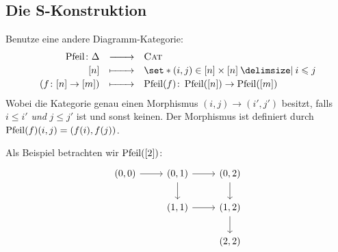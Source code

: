 \subsection{Die S-Konstruktion} %
\label{sub:die_s_konstruktion}
Benutze eine andere Diagramm-Kategorie:
\[
	\begin{array}{rcl}
		\textstyle \mathrm{Pfeil} \colon \Delta &\xrightarrow{\minwidthbox{}{2em}} & \textstyle \textsc{Cat} \\[0.5ex]
		\textstyle \benbrace*{n} &\xmapsto{\minwidthbox{\mbox{ }}{2em}} & \textstyle \set*{(i,j) \in \benbrace*{n} \times \benbrace*{n} \given  i \le j} \\[0.5ex]
		\textstyle (f \colon \benbrace*{n} \to \benbrace*{m}) &\xmapsto{\minwidthbox{\mbox{ }}{2em}} & \textstyle \operatorname{Pfeil}(f) \colon \operatorname{Pfeil}(\benbrace*{n}) \to \operatorname{Pfeil}(\benbrace*{m})
	\end{array}
\]
Wobei die Kategorie genau einen Morphismus $(i,j) \to (i',j')$ besitzt, falls $i \le i'$ \emph{und} $j \le j'$ ist und sonst keinen. Der Morphismus ist definiert durch $\operatorname{Pfeil}(f)(i,j) = \enbrace*{f(i),f(j)}$.

Als Beispiel betrachten wir $\operatorname{Pfeil}(\benbrace*{2})$:
\[
	\begin{tikzcd}
		(0,0) \rar & (0,1) \rar \dar & (0,2) \dar \\
		& (1,1) \rar & (1,2) \dar \\
		& & (2,2)
	\end{tikzcd}
\]

